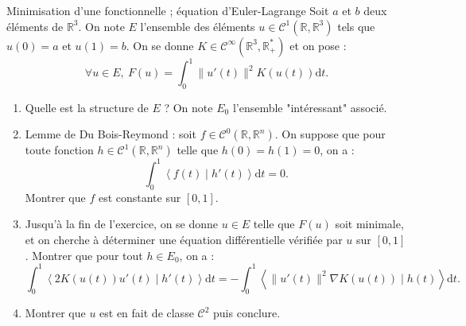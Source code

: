 \documentclass[french]{book}
\newcommand{\R}{\mathbb{R}}
\newcommand{\st}{^*}
\renewcommand{\d}{\text{d}}
\theoremstyle{definition}
\theoremstyle{remark}
\begin{document}
\begin{exo}[3]{Minimisation d'une fonctionnelle ; équation d'Euler-Lagrange}
	Soit $a$ et $b$ deux éléments de $\R^3$. On note $E$ l'ensemble des éléments $u\in\mathcal{C}^1(\R,\R^3)$ tels que $u(0)=a$ et $u(1)=b$. On se donne $K\in\mathcal{C}^\infty(\R^3,\R_+\st)$ et on pose :
	$$\forall u\in E,\ F(u)=\int_{0}^{1}\lVert u'(t)\rVert^2 K(u(t))\d t.$$
	\begin{enumerate}
		\item Quelle est la structure de $E$ ? On note $E_0$ l'ensemble "intéressant" associé.
		\item Lemme de Du Bois-Reymond : soit $f\in\mathcal{C}^0(\R,\R^n)$. On suppose que pour toute fonction $h\in\mathcal{C}^1(\R,\R^n)$ telle que $h(0)=h(1)=0$, on a :
		$$\int_{0}^{1}\left\langle f(t)\mid h'(t)\right\rangle\d t=0.$$ Montrer que $f$ est constante sur $[0,1]$.
		\item Jusqu'à la fin de l'exercice, on se donne $u\in E$ telle que $F(u)$ soit minimale, et on cherche à déterminer une équation différentielle vérifiée par $u$ sur $[0,1]$. Montrer que pour tout $h\in E_0$, on a :
		$$\int_{0}^{1}\left\langle 2K(u(t))u'(t)\mid h'(t)\right\rangle\d t=-\int_{0}^{1}\left\langle \lVert u'(t)\rVert^2\nabla K(u(t)) \mid h(t) \right\rangle\d t.$$
		\item Montrer que $u$ est en fait de classe $\mathcal{C}^2$ puis conclure.
	\end{enumerate}
\end{exo}
\end{document}
